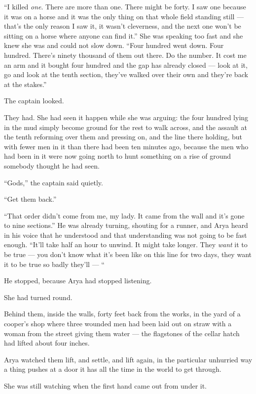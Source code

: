 “I killed \textit{one}. There are more than one. There might be forty. I saw one because it was on a horse and it was the only thing on that whole field standing still — that’s the only reason I saw it, it wasn’t cleverness, and the next one won’t be sitting on a horse where anyone can find it.” She was speaking too fast and she knew she was and could not slow down. “Four hundred went down. Four hundred. There’s ninety thousand of them out there. Do the number. It cost me an arm and it bought four hundred and the gap has already closed — look at it, go and look at the tenth section, they’ve walked over their own and they’re back at the stakes.”

The captain looked.

They had. She had seen it happen while she was arguing: the four hundred lying in the mud simply become ground for the rest to walk across, and the assault at the tenth reforming over them and pressing on, and the line there holding, but with fewer men in it than there had been ten minutes ago, because the men who had been in it were now going north to hunt something on a rise of ground somebody thought he had seen.

“Gods,” the captain said quietly.

“Get them back.”

“That order didn’t come from me, my lady. It came from the wall and it’s gone to nine sections.” He was already turning, shouting for a runner, and Arya heard in his voice that he understood and that understanding was not going to be fast enough. “It’ll take half an hour to unwind. It might take longer. They \textit{want} it to be true — you don’t know what it’s been like on this line for two days, they want it to be true so badly they’ll — “

He stopped, because Arya had stopped listening.

She had turned round.

\sceneBreak

Behind them, inside the walls, forty feet back from the works, in the yard of a cooper’s shop where three wounded men had been laid out on straw with a woman from the street giving them water — the flagstones of the cellar hatch had lifted about four inches.

Arya watched them lift, and settle, and lift again, in the particular unhurried way a thing pushes at a door it has all the time in the world to get through.

She was still watching when the first hand came out from under it.

